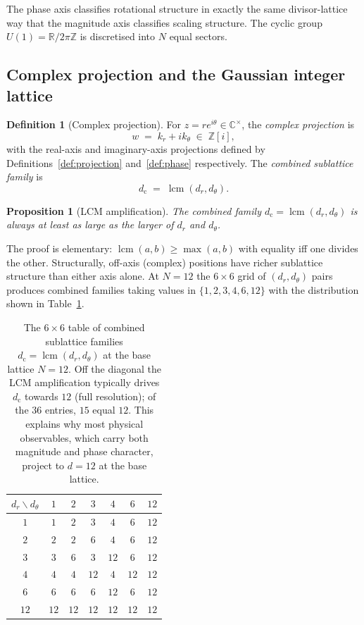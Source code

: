 \documentclass[11pt,a4paper]{article}
\newtheorem{proposition}[theorem]{Proposition}
\theoremstyle{definition}
\newtheorem{definition}[theorem]{Definition}
\theoremstyle{remark}
\newcommand{\R}{\mathbb{R}}
\newcommand{\Z}{\mathbb{Z}}
\newcommand{\C}{\mathbb{C}}
\DeclareMathOperator{\lcm}{lcm}
\begin{document}
The phase axis classifies rotational structure in exactly the same divisor-lattice way that the magnitude axis classifies scaling structure. The cyclic group $U(1) = \R/2\pi\Z$ is discretised into $N$ equal sectors.

\subsection{Complex projection and the Gaussian integer lattice}

\begin{definition}[Complex projection]\label{def:complex}
For $z = r e^{i\theta}\in\C^{\times}$, the \emph{complex projection} is
\[
w \;=\; k_{r}+i k_{\theta} \;\in\; \Z[i],
\]
with the real-axis and imaginary-axis projections defined by Definitions~\ref{def:projection} and~\ref{def:phase} respectively. The \emph{combined sublattice family} is
\[
d_{\mathrm{c}} \;=\; \lcm(d_{r},d_{\theta}).
\]
\end{definition}

\begin{proposition}[LCM amplification]\label{prop:lcm}
The combined family $d_{\mathrm{c}}=\lcm(d_{r},d_{\theta})$ is always at least as large as the larger of $d_{r}$ and $d_{\theta}$.
\end{proposition}

The proof is elementary: $\lcm(a,b)\ge \max(a,b)$ with equality iff one divides the other. Structurally, off-axis (complex) positions have richer sublattice structure than either axis alone. At $N=12$ the $6\times 6$ grid of $(d_{r},d_{\theta})$ pairs produces combined families taking values in $\{1,2,3,4,6,12\}$ with the distribution shown in Table~\ref{tab:complex12}.

\begin{table}[h]
\centering
\begin{tabular}{@{}c c c c c c c@{}}
\toprule
$d_{r}\backslash d_{\theta}$ & $1$ & $2$ & $3$ & $4$ & $6$ & $12$\\
\midrule
$1$ & $1$ & $2$ & $3$ & $4$ & $6$ & $12$\\
$2$ & $2$ & $2$ & $6$ & $4$ & $6$ & $12$\\
$3$ & $3$ & $6$ & $3$ & $12$ & $6$ & $12$\\
$4$ & $4$ & $4$ & $12$ & $4$ & $12$ & $12$\\
$6$ & $6$ & $6$ & $6$ & $12$ & $6$ & $12$\\
$12$ & $12$ & $12$ & $12$ & $12$ & $12$ & $12$\\
\bottomrule
\end{tabular}
\caption{The $6\times 6$ table of combined sublattice families $d_{\mathrm{c}}=\lcm(d_{r},d_{\theta})$ at the base lattice $N=12$. Off the diagonal the LCM amplification typically drives $d_{\mathrm{c}}$ towards $12$ (full resolution); of the $36$ entries, $15$ equal $12$. This explains why most physical observables, which carry both magnitude and phase character, project to $d=12$ at the base lattice.}
\label{tab:complex12}
\end{table}
\end{document}
